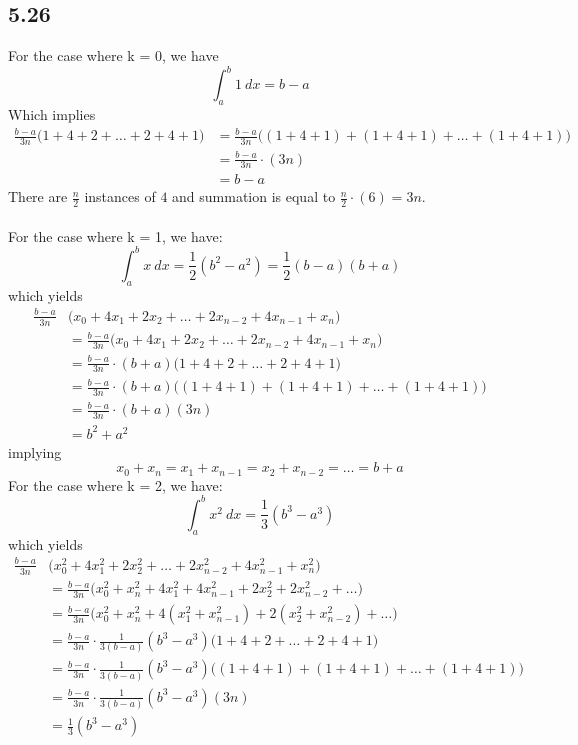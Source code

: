 \documentclass[letterpaper,12pt]{article}
\theoremstyle{definition}
\begin{document}
\subsection*{5.26}
For the case where k = 0, we have
\[ \int_a^b 1 ~ dx = b - a  \]
Which implies
\begin{align*}
    \frac{b-a}{3n} \big( 1 + 4 + 2 + \dots + 2 + 4 + 1 \big)
    &= \frac{b-a}{3n} \big( (1 + 4 + 1) + (1 + 4 + 1) + \dots + (1 + 4 + 1) \big)\\
    &= \frac{b-a}{3n}\cdot (3n)\\
    &= b-a
\end{align*}
There are $\frac{n}{2}$ instances of $4$ and summation is equal to $\frac{n}{2} \cdot (6) = 3n$.\\
\\
For the case where k = 1, we have:
\[ \int_a^b x ~ dx = \frac{1}{2} (b^2 - a^2) = \frac{1}{2} (b-a)(b+a) \]
which yields
\begin{align*}
    \frac{b-a}{3n} &\big( x_0 + 4x_1 + 2x_2 + \dots + 2x_{n-2} + 4x_{n-1} + x_n \big)\\
    &= \frac{b-a}{3n} \big( x_0 + 4x_1 + 2x_2 + \dots + 2x_{n-2} + 4x_{n-1} + x_n \big)\\ 
    &= \frac{b-a}{3n} \cdot (b+a)\big( 1 + 4 + 2 + \dots + 2 + 4 + 1 \big)\\ 
    &= \frac{b-a}{3n}\cdot (b+a)\big( (1 + 4 + 1) + (1 + 4 + 1) + \dots + (1 + 4 + 1) \big)\\
    &= \frac{b-a}{3n}\cdot (b+a)(3n)\\
    &= b^2 + a^2
\end{align*}
implying  \[x_0 + x_n = x_1 + x_{n-1} = x_2 + x_{n-2} = \dots = b + a\]
For the case where k = 2, we have:
\[ \int_a^b x^2 ~ dx = \frac{1}{3} (b^3 - a^3) \]
which yields
\begin{align*}
    \frac{b-a}{3n} &\big( x_0^2 + 4x_1^2 + 2x_2^2 + \dots + 2x_{n-2}^2 + 4x_{n-1}^2 + x_n^2 \big)\\
    &= \frac{b-a}{3n} \big( x_0^2 + x_n^2 + 4x_1^2 + 4x_{n-1}^2 + 2x_2^2 + 2x_{n-2}^2 + \dots\big)\\ 
    &= \frac{b-a}{3n} \big( x_0^2 + x_n^2 + 4( x_1^2 + x_{n-1}^2) + 2 (x_2^2 + x_{n-2}^2) + \dots\big)\\ 
    &= \frac{b-a}{3n} \cdot \frac{1}{3(b-a)}(b^3 - a^3)\big( 1 + 4 + 2 + \dots + 2 + 4 + 1 \big)\\  
    &= \frac{b-a}{3n} \cdot \frac{1}{3(b-a)}(b^3 - a^3)\big( (1 + 4 + 1) + (1 + 4 + 1) + \dots + (1 + 4 + 1) \big)\\
    &= \frac{b-a}{3n} \cdot \frac{1}{3(b-a)}(b^3 - a^3)(3n)\\
    &= \frac{1}{3}(b^3 - a^3)\\
\end{align*}
\end{document}
